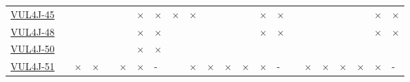 \begin{table}[!htbp]
{\begin{tabular}{|l|lll|ll|ll||lll|ll|ll||lll|ll|ll|}
		\href{https://github.com/esigate/esigate/commit/30cad23a8f282600c9b045e1af09f6f8a65357b1}{VUL4J-45} & \cellcolor{green}\checkmark & \cellcolor{yellow}\halfcheckmark & \cellcolor{green}\checkmark & \cellcolor{green}\checkmark & \cellcolor{green}\checkmark & \cellcolor{red}$\times$ & \cellcolor{red}$\times$  & \cellcolor{red}$\times$ & \cellcolor{red}$\times$ & \cellcolor{green}\checkmark & \cellcolor{green}\checkmark & \cellcolor{green}\checkmark & \cellcolor{red}$\times$ & \cellcolor{red}$\times$     & \cellcolor{green}\checkmark &\cellcolor{yellow}\halfcheckmark & \cellcolor{green}\checkmark & \cellcolor{green}\checkmark & \cellcolor{green}\checkmark & \cellcolor{red}$\times$ & \cellcolor{red}$\times$\\ 
		\href{https://github.com/inversoft/prime-jwt/commit/abb0d479389a2509f939452a6767dc424bb5e6ba}{VUL4J-48} & \cellcolor{green}\checkmark & \cellcolor{yellow}\halfcheckmark & \cellcolor{green}\checkmark &
		\cellcolor{yellow}\halfcheckmark & \cellcolor{green}\checkmark & \cellcolor{red}$\times$ & \cellcolor{red}$\times$  & \cellcolor{green}\checkmark & \cellcolor{yellow}\halfcheckmark & \cellcolor{green}\checkmark & \cellcolor{yellow}\halfcheckmark & \cellcolor{green}\checkmark & \cellcolor{red}$\times$ & \cellcolor{red}$\times$     & \cellcolor{green}\checkmark & \cellcolor{yellow}\halfcheckmark & \cellcolor{green}\checkmark & \cellcolor{yellow}\halfcheckmark & \cellcolor{green}\checkmark & \cellcolor{red}$\times$ & \cellcolor{red}$\times$\\ 
		\href{https://github.com/javamelody/javamelody/commit/aacbc46151ff4ac1ca34ce0899c2a6113071c66e}{VUL4J-50} & \cellcolor{green}\checkmark & \cellcolor{yellow}\halfcheckmark & \cellcolor{green}\checkmark &
		\cellcolor{yellow}\halfcheckmark & \cellcolor{green}\checkmark & \cellcolor{red}$\times$ & \cellcolor{red}$\times$  & \cellcolor{green}\checkmark & \cellcolor{green}\checkmark & \cellcolor{green}\checkmark & \cellcolor{green}\checkmark & \cellcolor{green}\checkmark & \cellcolor{green}\checkmark & \cellcolor{green}\checkmark     & \cellcolor{green}\checkmark & \cellcolor{green}\checkmark & \cellcolor{green}\checkmark & \cellcolor{green}\checkmark & \cellcolor{green}\checkmark & \cellcolor{green}\checkmark & \cellcolor{green}\checkmark\\ 
		\href{https://github.com/jenkinsci/ccm-plugin/commit/066cb43b4413b3490d822ec8b8a32072ebd213ca}{VUL4J-51} & \cellcolor{green}\checkmark & \cellcolor{red}$\times$ & \cellcolor{red}$\times$ & \cellcolor{yellow}\halfcheckmark & \cellcolor{red}$\times$ & \cellcolor{red}$\times$ & \cellcolor{lightgray}-  & \cellcolor{green}\checkmark & \cellcolor{red}$\times$ & \cellcolor{red}$\times$ & \cellcolor{red}$\times$ & \cellcolor{red}$\times$ & \cellcolor{red}$\times$ & \cellcolor{lightgray}-     & \cellcolor{green}\checkmark & \cellcolor{red}$\times$ & \cellcolor{red}$\times$ & \cellcolor{red}$\times$ & \cellcolor{red}$\times$ & \cellcolor{red}$\times$ & \cellcolor{lightgray}-\\ 

\end{tabular}}
\end{table}
